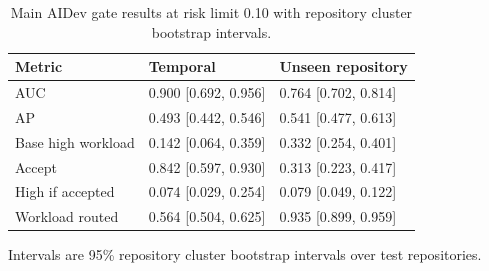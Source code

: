 \begin{table}[t]
\centering
\scriptsize
\caption{Main AIDev gate results at risk limit 0.10 with repository cluster bootstrap intervals.}
\label{tab:aidev-main}
\begin{tabular}{lll}
\toprule
Metric & Temporal & Unseen repository \\
\midrule
AUC & 0.900 [0.692, 0.956] & 0.764 [0.702, 0.814] \\
AP & 0.493 [0.442, 0.546] & 0.541 [0.477, 0.613] \\
Base high workload & 0.142 [0.064, 0.359] & 0.332 [0.254, 0.401] \\
Accept & 0.842 [0.597, 0.930] & 0.313 [0.223, 0.417] \\
High if accepted & 0.074 [0.029, 0.254] & 0.079 [0.049, 0.122] \\
Workload routed & 0.564 [0.504, 0.625] & 0.935 [0.899, 0.959] \\
\bottomrule
\end{tabular}
\par\footnotesize{Intervals are 95\% repository cluster bootstrap intervals over test repositories.}
\end{table}
